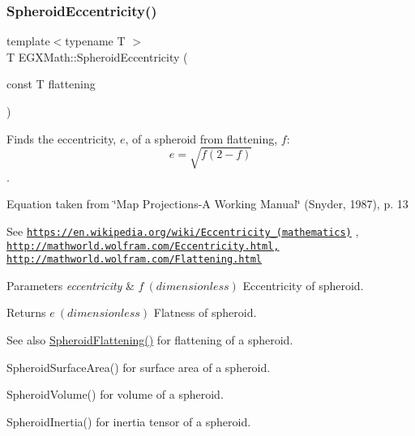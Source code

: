 \subsubsection{\texorpdfstring{Spheroid\+Eccentricity()}{SpheroidEccentricity()}\hspace{0.1cm}{\footnotesize\ttfamily [1/2]}}
{\footnotesize\ttfamily template$<$typename T $>$ \\
T E\+G\+X\+Math\+::\+Spheroid\+Eccentricity (\begin{DoxyParamCaption}\item[{const T}]{flattening }\end{DoxyParamCaption})}



Finds the eccentricity, $e$, of a spheroid from flattening, $f$\+: \[ e = \sqrt{f (2 - f)} \]. 

Equation taken from \char`\"{}\+Map Projections-\/\+A Working Manual\char`\"{} (Snyder, 1987), p. 13

See \href{https://en.wikipedia.org/wiki/Eccentricity_(mathematics)}{\tt https\+://en.\+wikipedia.\+org/wiki/\+Eccentricity\+\_\+(mathematics)} , \href{http://mathworld.wolfram.com/Eccentricity.html,}{\tt http\+://mathworld.\+wolfram.\+com/\+Eccentricity.\+html,} \href{http://mathworld.wolfram.com/Flattening.html}{\tt http\+://mathworld.\+wolfram.\+com/\+Flattening.\+html} 
\begin{DoxyParams}{Parameters}
{\em eccentricity} & $ f\ (dimensionless)$ Eccentricity of spheroid. \\
\hline
\end{DoxyParams}
\begin{DoxyReturn}{Returns}
$ e\ (dimensionless)$ Flatness of spheroid. 
\end{DoxyReturn}
\begin{DoxySeeAlso}{See also}
\mbox{\hyperlink{group___e_g_x_math-_geometry-3_d-_spheroid-_flattening_ga640f4bcd86aa4c378819bffda31c0852}{Spheroid\+Flattening()}} for flattening of a spheroid. 

Spheroid\+Surface\+Area() for surface area of a spheroid. 

Spheroid\+Volume() for volume of a spheroid. 

Spheroid\+Inertia() for inertia tensor of a spheroid. 
\end{DoxySeeAlso}
\mbox{\label{group___e_g_x_math-_geometry-3_d-_spheroid-_eccentricity_gab4c867532eef5a52e8e575e2a6b18bf8}} 
